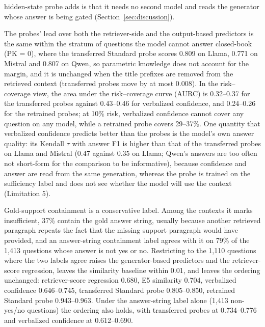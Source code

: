 \documentclass[acmsmall,screen,review]{acmart}
\begin{document}
hidden-state probe adds is that it needs no second model and reads the generator whose answer is being gated (Section~\ref{sec:discussion}).

The probes' lead over both the retriever-side and the output-based predictors is the same within the stratum of questions the model cannot answer closed-book (PK = 0), where the transferred Standard probe scores 0.809 on Llama, 0.771 on Mistral and 0.807 on Qwen, so parametric knowledge does not account for the margin, and it is unchanged when the title prefixes are removed from the retrieved context (transferred probes move by at most 0.008). In the risk--coverage view, the area under the risk--coverage curve (AURC) is 0.32--0.37 for the transferred probes against 0.43--0.46 for verbalized confidence, and 0.24--0.26 for the retrained probes; at 10\% risk, verbalized confidence cannot cover any question on any model, while a retrained probe covers 29--37\%. One quantity that verbalized confidence predicts better than the probes is the model's own answer quality: its Kendall $\tau$ with answer F1 is higher than that of the transferred probes on Llama and Mistral (0.47 against 0.35 on Llama; Qwen's answers are too often not short-form for the comparison to be informative), because confidence and answer are read from the same generation, whereas the probe is trained on the sufficiency label and does not see whether the model will use the context (Limitation 5).

Gold-support containment is a conservative label. Among the contexts it marks insufficient, 37\% contain the gold answer string, usually because another retrieved paragraph repeats the fact that the missing support paragraph would have provided, and an answer-string containment label agrees with it on 79\% of the 1,413 questions whose answer is not yes or no. Restricting to the 1,110 questions where the two labels agree raises the generator-based predictors and the retriever-score regression, leaves the similarity baseline within 0.01, and leaves the ordering unchanged: retriever-score regression 0.680, E5 similarity 0.704, verbalized confidence 0.646--0.745, transferred Standard probe 0.805--0.850, retrained Standard probe 0.943--0.963. Under the answer-string label alone (1,413 non-yes/no questions) the ordering also holds, with transferred probes at 0.734--0.776 and verbalized confidence at 0.612--0.690.
\end{document}
